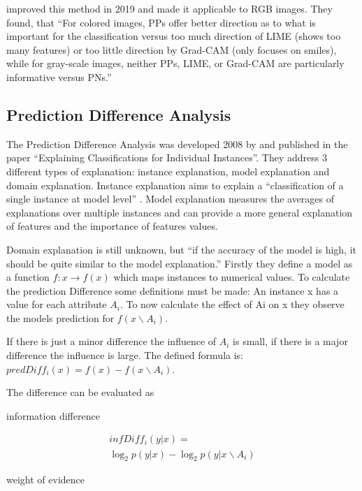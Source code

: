  improved this method in 2019 and made it applicable to RGB images.
They found, that “For colored images, PPs offer better direction as to what is important for the classification versus too much direction of LIME (shows too many features) or too little direction by Grad-CAM (only focuses on smiles), while for gray-scale images, neither PPs, LIME, or Grad-CAM are particularly informative versus PNs.” 

\subsection{Prediction Difference Analysis}
The Prediction Difference Analysis was developed 2008 by  and published in the paper “Explaining Classifications for Individual Instances”. They address 3 different types of explanation: instance explanation, model explanation and domain explanation. Instance explanation aims to explain a “classification of a single instance at model level” \cite[2]{RobnikSikonja.2008}. Model explanation measures the averages of explanations over multiple instances and can provide a more general explanation of features and the importance of features values.
\par
Domain explanation is still unknown, but “if the accuracy of the model is high, it should be quite similar to the model explanation.” \cite[2]{RobnikSikonja.2008} Firstly they define a model as a function \(f : x \rightarrow f(x)\) which maps instances to numerical values. To calculate the prediction Difference some definitions must be made: An instance x has a value for each attribute \(A_{i}\). To now calculate the effect of Ai on x they observe the models prediction for  \(f(x \backslash A_{i})\). 
\par
If there is just a minor difference the influence of \(A_{i}\) is small, if there is a major difference the influence is large. The defined formula is: 
\(predDiff_{i} (x) = f(x)− f(x \backslash A_{i})\).
\par
The difference can be evaluated as 
\par
    information difference
    \par
        \begin{multline}
              infDiff_{i}(y|x) = \\
              \log_{2} p(y|x)−\log_{2} p(y|x \backslash A_{i})
        \end{multline}
        \par      
    weight of evidence
